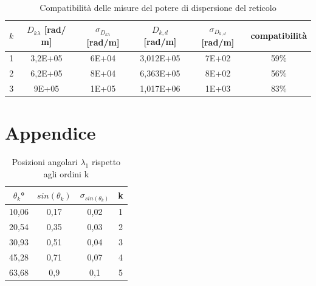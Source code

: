 \documentclass{article}
\begin{document}
        \begin{table}[H]
            \centering
            \begin{tabular}{c c c c c c }
                \toprule 
                $k$ & $D_{k\lambda}$ [rad/ m] & $\sigma_{D_{k\lambda}}$ [rad/m]  & $D_{k,d}$ [rad/m] & $\sigma_{D_{k,d}}$ [rad/m] & compatibilità \\
                \midrule
                1	&	3,2E+05	&	6E+04	&	3,012E+05	&	7E+02	&	59\% \\
                2	&	6,2E+05	&	8E+04	&	6,363E+05	&	8E+02	&	56\% \\
                3	&	9E+05	&	1E+05	&	1,017E+06	&	1E+03	&	83\% \\
                \bottomrule
            \end{tabular}
            \caption{Compatibilità delle misure del potere di dispersione del reticolo}
            \label{compatibilità D}
        \end{table}


    \section{Appendice}
    \label{Appendice}
    
        \begin{table}[H]

            \centering

            \begin{tabular}{c c c c}

                \toprule 
                $\theta_k$° & $sin(\theta_k)$ & $\sigma_{sin(\theta_k)}$ & k \\
                
                \midrule
                10,06	&	0,17	&	0,02	&	1\\
                20,54	&	0,35	&	0,03	&	2\\
                30,93	&	0,51	&	0,04	&	3\\
                45,28	&	0,71	&	0,07	&	4\\
                63,68	&	0,9	    &	0,1	    &	5\\
                \bottomrule
            
            \end{tabular}
            
            \caption{Posizioni angolari $\lambda_1$ rispetto agli ordini k}
            \label{tabular:posizioni angolari sodio}

        \end{table}
\end{document}

